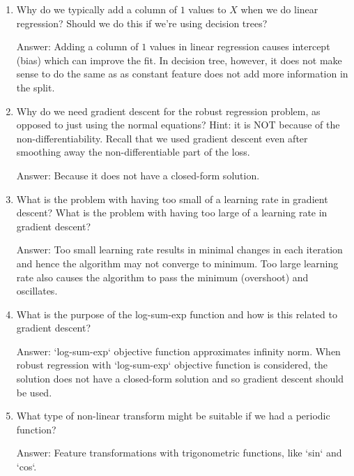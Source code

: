 \documentclass{article}
\newcommand{\gre}[1]{\textcolor{gre}{#1}}
\newcommand\ans[1]{\par\gre{Answer: #1}}
\begin{document}
\begin{enumerate}
\item Why do we typically add a column of $1$ values to $X$ when we do linear regression? Should we do this if we're using decision trees?
\ans{Adding a column of $1$ values in linear regression causes intercept (bias) which can improve the fit. In decision tree, however, it does not make sense to do the same as as constant feature does not add more information in the split.}

\item Why do we need gradient descent for the robust regression problem, as opposed to just using the normal equations? Hint: it is NOT because of the non-differentiability. Recall that we used gradient descent even after smoothing away the non-differentiable part of the loss.
\ans{Because it does not have a closed-form solution.}

\item What is the problem with having too small of a learning rate in gradient descent? What is the problem with having too large of a learning rate in gradient descent?
\ans{Too small learning rate results in minimal changes in each iteration and hence the algorithm may not converge to minimum. Too large learning rate also causes the algorithm to pass the minimum (overshoot) and oscillates. }

\item What is the purpose of the log-sum-exp function and how is this related to gradient descent?
\ans{`log-sum-exp` objective function approximates infinity norm. When robust regression with `log-sum-exp` objective function is considered, the solution does not have a closed-form solution and so gradient descent should be used.}

\item What type of non-linear transform might be suitable if we had a periodic function?
\ans{Feature transformations with trigonometric functions, like `sin` and `cos`.}

\end{enumerate}
\end{document}
